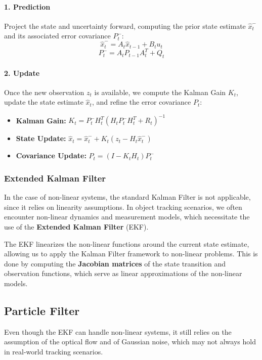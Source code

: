 \paragraph{1. Prediction}
Project the state and uncertainty forward, computing the prior state estimate $\hat{x}_t^-$ 
and its associated error covariance $P_t^-$:
\[ \hat{x}_t^- = A_t \hat{x}_{t-1} + B_t u_t \]
\[ P_t^- = A_t P_{t-1} A_t^T + Q_t \]

\paragraph{2. Update}
Once the new observation $z_t$ is available, we compute the Kalman Gain $K_t$, update the state estimate $\hat{x}_t$,
and refine the error covariance $P_t$:
\begin{itemize}
    \item \textbf{Kalman Gain:} $K_t = P_t^- H_t^T (H_t P_t^- H_t^T + R_t)^{-1}$
    \item \textbf{State Update:} $\hat{x}_t = \hat{x}_t^- + K_t (z_t - H_t \hat{x}_t^-)$
    \item \textbf{Covariance Update:} $P_t = (I - K_t H_t) P_t^-$
\end{itemize}

\subsubsection{Extended Kalman Filter}
In the case of non-linear systems, the standard Kalman Filter is not applicable, since it relies on linearity assumptions.
In object tracking scenarios, we often encounter non-linear dynamics and measurement models, which necessitate the use of the \textbf{Extended Kalman Filter} (EKF).

The EKF linearizes the non-linear functions around the current state estimate, allowing us to apply the Kalman Filter framework to non-linear problems.
This is done by computing the \textbf{Jacobian matrices} of the state transition and observation functions, which serve as linear approximations of the non-linear models.

\subsection{Particle Filter}
Even though the EKF can handle non-linear systems, it still relies on the assumption of the optical flow and of Gaussian noise, 
which may not always hold in real-world tracking scenarios.

